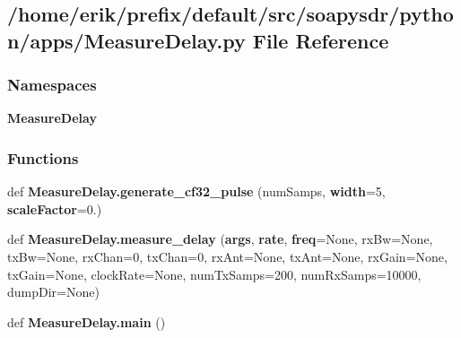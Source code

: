 \subsection{/home/erik/prefix/default/src/soapysdr/python/apps/\+Measure\+Delay.py File Reference}
\label{MeasureDelay_8py}
\subsubsection*{Namespaces}
\begin{DoxyCompactItemize}
\item 
 {\bf Measure\+Delay}
\end{DoxyCompactItemize}
\subsubsection*{Functions}
\begin{DoxyCompactItemize}
\item 
def {\bf Measure\+Delay.\+generate\+\_\+cf32\+\_\+pulse} (num\+Samps, {\bf width}=5, {\bf scale\+Factor}=0.)
\item 
def {\bf Measure\+Delay.\+measure\+\_\+delay} ({\bf args}, {\bf rate}, {\bf freq}=None, rx\+Bw=None, tx\+Bw=None, rx\+Chan=0, tx\+Chan=0, rx\+Ant=None, tx\+Ant=None, rx\+Gain=None, tx\+Gain=None, clock\+Rate=None, num\+Tx\+Samps=200, num\+Rx\+Samps=10000, dump\+Dir=None)
\item 
def {\bf Measure\+Delay.\+main} ()
\end{DoxyCompactItemize}
